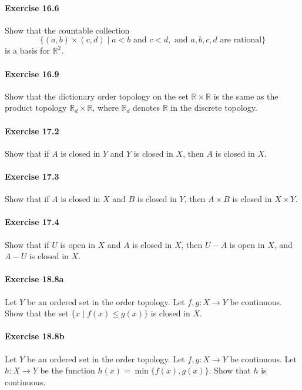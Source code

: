 \documentclass{article}
\begin{document}
\paragraph{Exercise 16.6} Show that the countable collection \[\{(a, b) \times (c, d) \mid a < b \text{ and } c < d, \text{ and } a, b, c, d \text{ are rational}\}\] is a basis for $\mathbb{R}^2$.

\paragraph{Exercise 16.9} Show that the dictionary order topology on the set $\mathbb{R} \times \mathbb{R}$ is the same as the product topology $\mathbb{R}_d \times \mathbb{R}$, where $\mathbb{R}_d$ denotes $\mathbb{R}$ in the discrete topology.

\paragraph{Exercise 17.2} Show that if $A$ is closed in $Y$ and $Y$ is closed in $X$, then $A$ is closed in $X$.

\paragraph{Exercise 17.3} Show that if $A$ is closed in $X$ and $B$ is closed in $Y$, then $A \times B$ is closed in $X \times Y$.

\paragraph{Exercise 17.4} Show that if $U$ is open in $X$ and $A$ is closed in $X$, then $U-A$ is open in $X$, and $A-U$ is closed in $X$.

\paragraph{Exercise 18.8a} Let $Y$ be an ordered set in the order topology. Let $f, g: X \rightarrow Y$ be continuous. Show that the set $\{x \mid f(x) \leq g(x)\}$ is closed in $X$.

\paragraph{Exercise 18.8b} Let $Y$ be an ordered set in the order topology. Let $f, g: X \rightarrow Y$ be continuous. Let $h: X \rightarrow Y$ be the function $h(x)=\min \{f(x), g(x)\}.$ Show that $h$ is continuous.
\end{document}
